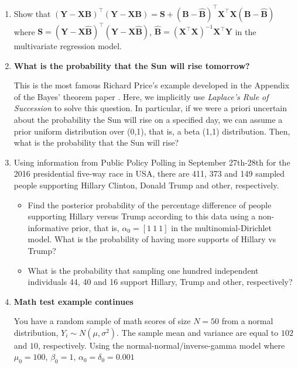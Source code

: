 \begin{enumerate}
	\item Show that $({\bm{Y}}-{\bm{X}}{\bm{B}})^{\top}({\bm{Y}}-{\bm{X}}{\bm{B}})={\bm{S}}+({\bm{B}}-\widehat{\bm{B}})^{\top}{\bm{X}}^{\top}{\bm{X}}({\bm{B}}-\widehat{\bm{B}})$ where ${\bm{S}}= ({\bm{Y}}-{\bm{X}}\widehat{\bm{B}})^{\top}({\bm{Y}}-{\bm{X}}\widehat{\bm{B}})$, $\widehat{\bm{B}}= ({\bm{X}}^{\top}{\bm{X}})^{-1}{\bm{X}}^{\top}{\bm{Y}}$ in the multivariate regression model.
	
	\item \textbf{What is the probability that the Sun will rise tomorrow?}
	
	This is the most famous Richard Price's example developed in the Appendix of the Bayes' theorem paper \cite{bayes1763lii}. Here, we implicitly use \textit{Laplace's Rule of Succession} to solve this question. In particular, if we were a priori uncertain about the probability the Sun will rise on a specified day, we can assume a prior uniform distribution over (0,1), that is, a beta (1,1) distribution. Then, what is the probability that the Sun will rise?
	
	
	\item Using information from Public Policy Polling in September 27th-28th for the 2016 presidential five-way race in USA, there are 411, 373 and 149 sampled people supporting Hillary Clinton, Donald Trump and other, respectively. 
	
	\begin{itemize}
		\item Find the posterior probability of the percentage difference of people supporting Hillary versus Trump according to this data using a non-informative prior, that is, $\alpha_0=[1 \ 1 \ 1]$ in the multinomial-Dirichlet model. What is the probability of having more supports of Hillary vs Trump?
		
		\item What is the probability that sampling one hundred independent individuals 44, 40 and 16 support Hillary, Trump and other, respectively?  
	\end{itemize}

\item \textbf{Math test example continues}

You have a random sample of math scores of size $N=50$ from a normal distribution, $Y_i\sim {N}(\mu, \sigma^2)$. The sample mean and variance are equal to $102$ and $10$, respectively. Using the normal-normal/inverse-gamma model where $\mu_0=100$, $\beta_0=1$, $\alpha_0=\delta_0=0.001$


\end{enumerate}

